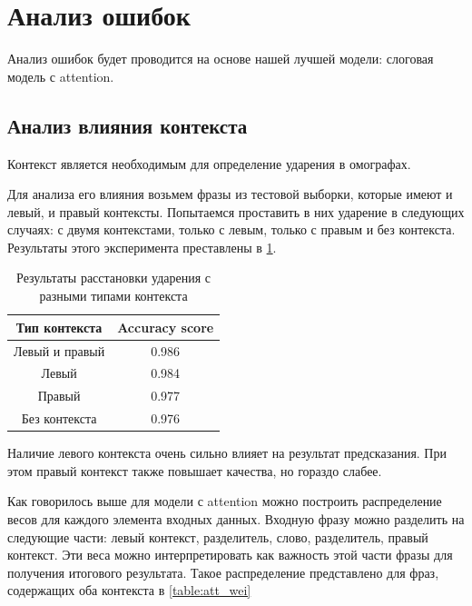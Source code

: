\documentclass[14pt, a4paper, russian]{extreport}
\begin{document}
\section{Анализ ошибок}
Анализ ошибок будет проводится на основе нашей лучшей модели: слоговая модель с attention.
\subsection{Анализ влияния контекста}
Контекст является необходимым для определение ударения в омографах. 

Для анализа его влияния возьмем фразы из тестовой выборки, которые имеют и  левый, и правый контексты. Попытаемся проставить в них ударение в следующих случаях: с двумя контекстами, только с левым, только с правым и без контекста. Результаты этого эксперимента преставлены в \cref{table:cont}.

\begin{table}[H]
	\caption{Результаты расстановки ударения с разными типами контекста}
	
	\begin{small}
		\begin{center}
			\begin{tabular}{|c | c |}
				\hline
				Тип контекста  & Accuracy score \\ \hline
				Левый и правый & 0.986          \\ \hline
				    Левый      & 0.984          \\ \hline
				    Правый     & 0.977          \\ \hline
				Без контекста  & 0.976          \\ \hline
			\end{tabular}
		\end{center}
	\end{small}
	\label{table:cont}
\end{table}

Наличие левого контекста очень сильно влияет на результат предсказания. При этом правый контекст также повышает качества, но гораздо слабее.

Как говорилось выше для модели с attention можно построить распределение весов для каждого элемента входных данных. Входную фразу можно разделить на следующие части: левый контекст, разделитель, слово, разделитель, правый контекст. Эти веса можно интерпретировать как важность этой части фразы для получения итогового результата. Такое распределение представлено для фраз, содержащих оба контекста в \cref{table:att_wei}
\end{document}
